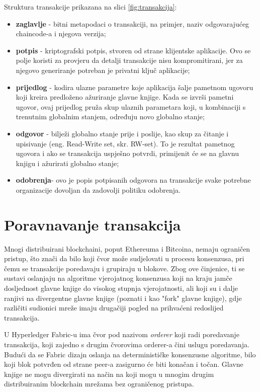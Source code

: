 \documentclass[times, utf8, diplomski]{fer}
\begin{document}
Struktura transakcije prikazana na slici \ref{fig:transakcija}:
\begin{itemize}
\item \textbf{zaglavlje} - bitni metapodaci o transakciji, na primjer, naziv odgovarajućeg chaincode-a i njegova verzija;
\item \textbf{potpis} - kriptografski potpis,  stvoren od strane klijentske aplikacije. Ovo se polje koristi za provjeru da detalji transakcije nisu kompromitirani, jer za njegovo generiranje potreban je privatni ključ aplikacije;
\item \textbf{prijedlog} - kodira ulazne parametre koje aplikacija šalje pametnom ugovoru koji kreira predloženo ažuriranje glavne knjige. Kada se izvrši pametni ugovor, ovaj prijedlog pruža skup ulaznih parametara koji, u kombinaciji s trenutnim globalnim stanjem, određuju novo globalno stanje;
\item \textbf{odgovor} - bilježi globalno stanje prije i poslije, kao skup za čitanje i upisivanje (eng. Read-Write set, skr. RW-set). To je rezultat pametnog ugovora i ako se transakcija uspješno potvrdi, primijenit će se na glavnu knjigu i ažurirati globalno stanje;
\item \textbf{odobrenja}- ovo je popis potpisanih odgovora na transakcije svake potrebne organizacije dovoljan da zadovolji politiku odobrenja.
\end{itemize}
\section{Poravnavanje transakcija}
Mnogi distribuirani blockchaini, poput Ethereuma i Bitcoina, nemaju ograničen pristup, što znači da bilo koji čvor može sudjelovati u procesu konsenzusa, pri čemu se transakcije poredavaju i grupiraju u blokove. Zbog ove činjenice, ti se sustavi oslanjaju na algoritme vjerojatnog konsenzusa koji na kraju jamče dosljednost glavne knjige do visokog stupnja vjerojatnosti, ali koji su i dalje ranjivi na divergentne glavne knjige (poznati i kao "fork" glavne knjige), gdje različiti sudionici mreže imaju drugačiji pogled na prihvaćeni redoslijed transakcija.

U Hyperledger Fabric-u ima čvor pod nazivom \textit{orderer} koji radi poredavanje transakcija, koji zajedno s drugim čvorovima orderer-a čini uslugu poredavanja.  Budući da se Fabric dizajn oslanja na determinističke konsenzusne algoritme, bilo koji blok potvrđen od strane peer-a zasigurno će biti konačan i točan.  Glavne knjige ne mogu divergirati na način na koji mogu u mnogim drugim distribuiranim blockchain mrežama bez ograničenog pristupa.
\end{document}

